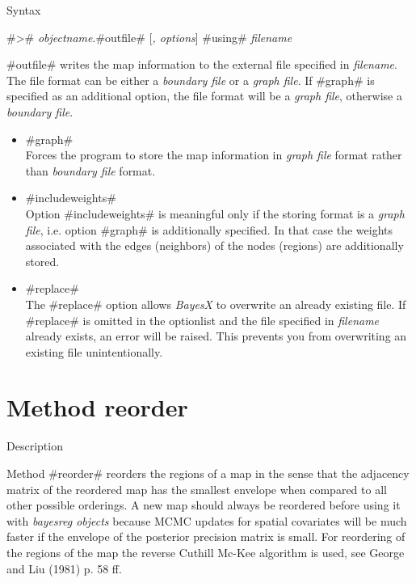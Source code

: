 \begin{stanza}{Syntax}

{#># {\em objectname}.#outfile# [{\em , options}] #using# {\em
filename}

#outfile# writes the map information to the external file
specified in {\em filename}. The file format can be either a {\em
boundary file} or a {\em graph file}. If #graph# is specified as
an additional option, the file format will be a {\em graph file},
otherwise a {\em boundary file}.}
\end{stanza}


\begin{itemize}
\item #graph# \\
Forces the program to store the map information in {\em graph
file} format rather than {\em boundary file} format.
\item #includeweights# \\
Option #includeweights# is meaningful only if the storing format
is a {\em graph file}, i.e. option #graph# is additionally
specified. In that case the weights associated with the edges
(neighbors) of the nodes (regions) are additionally stored.
\item #replace# \\
The #replace# option allows {\em BayesX} to overwrite an already
existing file. If #replace# is omitted in the optionlist and the
file specified in {\em filename} already exists, an error will be
raised. This prevents you from overwriting an existing file
unintentionally.
\end{itemize}



\clearpage



\section{Method reorder}
\label{mapreorder}  

\begin{stanza}{Description}

{Method #reorder# reorders the regions of a map in the sense that
the adjacency matrix of the reordered map has the smallest
envelope when compared to all other possible orderings. A new map
should always be reordered before using it with {\em bayesreg
objects} because MCMC updates for spatial covariates will be much
faster if the envelope of the posterior precision matrix is small.
For reordering of the regions of the map the reverse Cuthill
Mc-Kee algorithm is used, see George and Liu (1981) p. 58 ff.}
\end{stanza}

